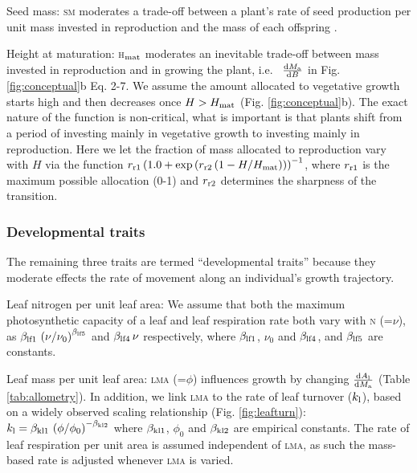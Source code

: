 \documentclass[9pt,twocolumn,twoside,lineno]{pnas-new}
\newcommand{\lma}{\textsc{lma}}
\newcommand{\seed}{\textsc{sm}}
\newcommand{\hmat}{\textsc{h}$_{\rm mat}$}
\newcommand{\nitrogen}{\textsc{n}}
\begin{document}
Seed mass: {\seed} moderates a trade-off between a plant's rate of seed production per unit mass invested in reproduction and the mass of each offspring  \citep{Moles-2006}.

Height at maturation: {\hmat} moderates an inevitable trade-off between mass invested in reproduction and in growing the plant, i.e.~ $\frac{{\rm d}M_{\rm a}}{{\rm d}B}$ in Fig. \ref{fig:conceptual}b Eq. {\color{pnasbluetext}2}-{\color{pnasbluetext}7}. We assume the amount allocated to vegetative growth starts high and then decreases once $H > H_{{\rm mat}}$  (Fig. \ref{fig:conceptual}b). The exact nature of the function is non-critical, what is important is that plants shift from a period of investing mainly in vegetative growth to investing mainly in reproduction. Here we let the fraction of mass allocated to reproduction vary with $H$ via the function $r_{\rm r1}  \left(1.0 + \exp\left(r_{\rm r2} \left(1 - H / H_{{\rm mat}}\right)\right)\right)^{-1}$, where $r_{\rm r1}$ is the maximum possible allocation (0-1) and $r_{\rm r2}$ determines the sharpness of the transition. 

\subsubsection*{Developmental traits} The remaining three traits are termed ``developmental traits'' because they moderate effects the rate of movement along an individual's growth trajectory. 

Leaf nitrogen per unit leaf area: We assume that both the maximum photosynthetic capacity of a leaf and leaf respiration rate both vary with {\nitrogen} (=$\nu$), as $\beta_{{\rm lf1}} \, \left(\nu / \nu_0 \right)^{\beta_{{\rm lf5}}}$ and $\beta_{{\rm lf4}}\, \nu$ respectively, where $\beta_{{\rm lf1}}$, $\nu_0$ and $\beta_{{\rm lf4}}$, and $\beta_{{\rm lf5}}$ are constants.

Leaf mass per unit leaf area: {\lma} (=$\phi$) influences growth by changing $\frac{{\rm d}A_{\rm l}}{{\rm d}M_{\rm a}}$ (Table \ref{tab:allometry}). In addition, we link {\lma} to the rate of leaf turnover ($k_{\rm l}$), based on a widely observed scaling relationship \citep{Wright-2004} (Fig. \ref{fig:leafturn}): $k_{\rm l} = \beta_{{\rm kl1}} \, \left(\phi/\phi_0\right)^{-\beta_{{\rm kl2}}}$ where $\beta_{{\rm kl1}}$, $\phi_0$ and $\beta_{{\rm kl2}}$ are empirical constants. The rate of leaf respiration per unit area is assumed independent of {\lma}\citep{Wright-2004}, as such the mass-based rate is adjusted whenever {\lma} is varied.
\end{document}
